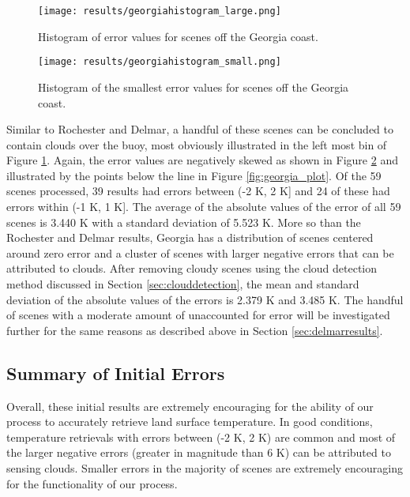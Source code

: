 \documentclass{book}
\begin{document}
\begin{figure}[H]
\centering
\texttt{[image: results/georgiahistogram\_large.png]}
\caption{Histogram of error values for scenes off the Georgia coast.}
\label{fig:georgiahistogram_large}
\end{figure}

\begin{figure}[H]
\centering
\texttt{[image: results/georgiahistogram\_small.png]}
\caption{Histogram of the smallest error values for scenes off the Georgia coast.}
\label{fig:georgiahistogram_small}
\end{figure}

Similar to Rochester and Delmar, a handful of these scenes can be concluded to contain clouds over the buoy, most obviously illustrated in the left most bin of Figure \ref{fig:georgiahistogram_large}.  Again, the error values are negatively skewed as shown in Figure \ref{fig:georgiahistogram_small} and illustrated by the points below the line in Figure \ref{fig:georgia_plot}.  Of the 59 scenes processed, 39 results had errors between (-2 K, 2 K] and 24 of these had errors within (-1 K, 1 K].  The average of the absolute values of the error of all 59 scenes is 3.440 K with a  standard deviation of 5.523 K.  More so than the  Rochester and Delmar results, Georgia has a distribution of scenes centered around zero error and a cluster of scenes with larger negative errors that can be attributed to clouds.  After removing cloudy scenes using the cloud detection method discussed in Section \ref{sec:clouddetection}, the mean and standard deviation of the absolute values of the errors is 2.379 K and 3.485 K.  The handful of scenes with a moderate amount of unaccounted for error will be investigated further for the same reasons as described above in Section \ref{sec:delmarresults}.

\subsection{Summary of Initial Errors}

Overall, these initial results are extremely encouraging for the ability of our process to accurately retrieve land surface temperature.  In good conditions, temperature retrievals with errors between (-2 K, 2 K) are common and most of the larger negative errors (greater in magnitude than 6 K) can be attributed to sensing clouds.  Smaller errors in the majority of scenes are extremely encouraging for the functionality of our process.
\end{document}
